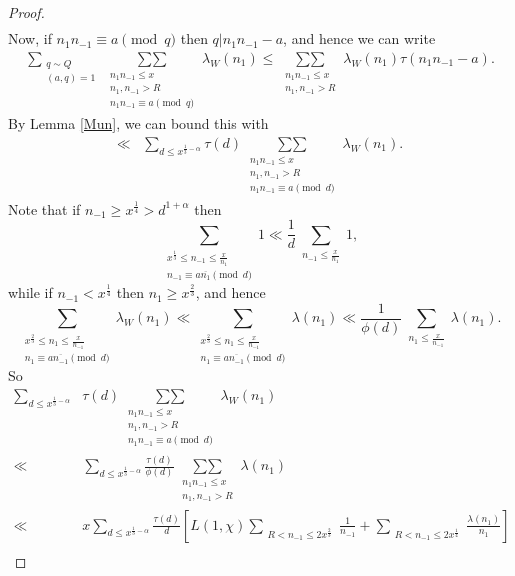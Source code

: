 \documentclass{amsart}
\begin{document}
\begin{proof}
\begin{align*}
\end{align*}
Now, if $n_1n_{-1}\equiv a \pmod q$ then $q|n_1n_{-1}-a$, and hence we can write
\begin{align*}
\sum_{\substack{q\sim Q  \\ (a,q)=1}}\mathop{\sum\sum}\limits_{\substack{n_1n_{-1}\leq x \\ n_1,n_{-1}>R \\ n_1n_{-1}\equiv a\pmod q}}\lambda_W\left(n_1\right) \leq \mathop{\sum\sum}\limits_{\substack{n_1n_{-1}\leq x \\ n_1,n_{-1}>R }}\lambda_W\left(n_1\right) \tau(n_1n_{-1}-a).
\end{align*}
By Lemma \ref{Mun}, we can bound this with
\begin{align*}
\ll &\sum_{d\leq x^{\frac 13-\alpha}} \tau(d)\mathop{\sum\sum}\limits_{\substack{n_1n_{-1}\leq x \\ n_1,n_{-1}>R \\ n_1n_{-1}\equiv a\pmod d}}\lambda_W\left(n_1\right) .
\end{align*}
Note that if $n_{-1}\geq x^\frac 14>d^{1+\alpha}$ then
$$\sum_{\substack{x^{\frac 13}\leq n_{-1}\leq \frac x{n_1} \\ n_{-1}\equiv a\overline{n_1}\pmod d}}1\ll \frac 1d\sum_{\substack{n_{-1}\leq \frac x{n_1} }}1,$$
while if $n_{-1}<x^\frac 14$ then $n_{1}\geq x^\frac 23$, and hence
$$\sum_{\substack{x^{\frac 23}\leq n_1\leq \frac x{n_{-1}} \\ n_{1}\equiv a\overline{n_{-1}}\pmod d}}\lambda_W(n_1)\ll \sum_{\substack{x^{\frac 23}\leq n_1\leq \frac x{n_{-1}} \\ n_{1}\equiv a\overline{n_{-1}}\pmod d}}\lambda(n_1)\ll  \frac 1{\phi(d)}\sum_{\substack{n_1\leq \frac x{n_{-1}} }}\lambda(n_1).$$
So
\begin{align*}
\sum_{d\leq x^{\frac 13-\alpha}} &\tau(d)\mathop{\sum\sum}\limits_{\substack{n_1n_{-1}\leq x \\ n_1,n_{-1}>R \\ n_1n_{-1}\equiv a\pmod d}}\lambda_W\left(n_1\right) \\
\ll &\sum_{d\leq x^{\frac 13-\alpha}} \frac{\tau(d)}{\phi(d)}\mathop{\sum\sum}\limits_{\substack{n_1n_{-1}\leq x \\ n_1,n_{-1}>R }}\lambda\left(n_1\right) \\
\ll &x\sum_{d\leq x^{\frac 13-\alpha}} \frac{\tau(d)}{d}\left[L(1,\chi)\mathop{\sum}\limits_{\substack{ R<n_{-1}\leq 2x^\frac 23}}\frac{1}{n_{-1}}+\mathop{\sum}\limits_{\substack{R<n_{-1}\leq 2x^\frac 14}}\frac{\lambda(n_1)}{n_{1}}\right]\\

\end{align*}
\end{proof}
\end{document}
